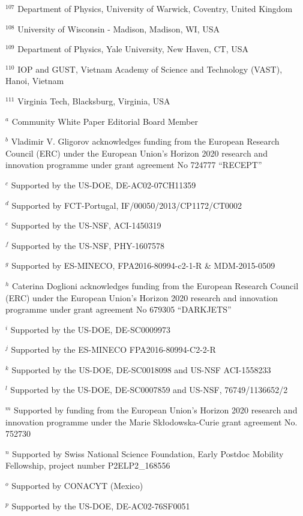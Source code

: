 \par {\footnotesize $^{107}$ Department of Physics, University of Warwick, Coventry, United Kingdom}
\par {\footnotesize $^{108}$ University of Wisconsin - Madison, Madison, WI, USA}
\par {\footnotesize $^{109}$ Department of Physics, Yale University, New Haven, CT, USA}
\par {\footnotesize $^{110}$ IOP and GUST, Vietnam Academy of Science and Technology (VAST), Hanoi, Vietnam}
\par {\footnotesize $^{111}$ Virginia Tech, Blacksburg, Virginia, USA}
\bigskip
\par {\footnotesize $^{a}$ Community White Paper Editorial Board Member}
\par {\footnotesize $^{b}$ Vladimir V. Gligorov acknowledges funding from the European Research Council (ERC) under the European Union's Horizon 2020 research and innovation programme under grant agreement No 724777 “RECEPT”}
\par {\footnotesize $^{c}$ Supported by the US-DOE, DE-AC02-07CH11359}
\par {\footnotesize $^{d}$ Supported by FCT-Portugal, IF/00050/2013/CP1172/CT0002}
\par {\footnotesize $^{e}$ Supported by the US-NSF, ACI-1450319}
\par {\footnotesize $^{f}$ Supported by the US-NSF, PHY-1607578}
\par {\footnotesize $^{g}$ Supported by ES-MINECO, FPA2016-80994-c2-1-R \& MDM-2015-0509}
\par {\footnotesize $^{h}$ Caterina Doglioni acknowledges funding from the European Research Council (ERC) under the European Union's Horizon 2020 research and innovation programme under grant agreement No 679305 “DARKJETS”}
\par {\footnotesize $^{i}$ Supported by the US-DOE, DE-SC0009973}
\par {\footnotesize $^{j}$ Supported by the ES-MINECO FPA2016-80994-C2-2-R}
\par {\footnotesize $^{k}$ Supported by the US-DOE, DE-SC0018098 and US-NSF ACI-1558233}
\par {\footnotesize $^{l}$ Supported by the US-DOE, DE-SC0007859 and US-NSF, 76749/1136652/2}
\par {\footnotesize $^{m}$ Supported by funding from the European Union’s Horizon 2020 research and innovation programme under the Marie Skłodowska-Curie grant agreement No. 752730}
\par {\footnotesize $^{n}$ Supported by Swiss National Science Foundation, Early Postdoc Mobility Fellowship, project number P2ELP2\_168556}
\par {\footnotesize $^{o}$ Supported by CONACYT (Mexico)}
\par {\footnotesize $^{p}$ Supported by the US-DOE, DE-AC02-76SF0051}
